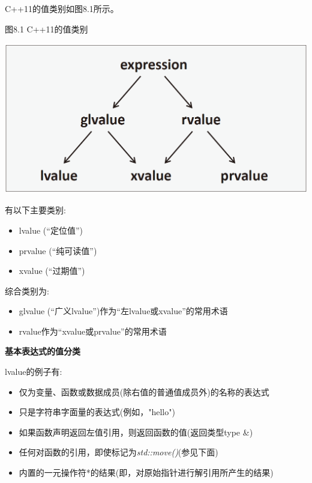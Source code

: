 C++11的值类别如图8.1所示。\par

\hspace*{\fill} \par %
图8.1 C++11的值类别\par

\begin{center}
	\includegraphics[width=1.0\textwidth]{content/1/chapter8/images/1}
\end{center}

有以下主要类别:\par

\begin{itemize}
	\item lvalue (“定位值”)
	\item prvalue (“纯可读值”)
	\item xvalue (“过期值”)
\end{itemize}

综合类别为:\par

\begin{itemize}
	\item glvalue (“广义lvalue”)作为“左lvalue或xvalue”的常用术语
	\item rvalue作为“xvalue或prvalue”的常用术语
\end{itemize}

\hspace*{\fill} \par %
\textbf{基本表达式的值分类}\par

lvalue的例子有:\par

\begin{itemize}
	\item 仅为变量、函数或数据成员(除右值的普通值成员外)的名称的表达式
	\item 只是字符串字面量的表达式(例如，"hello")
	\item 如果函数声明返回左值引用，则返回函数的值(返回类型type \&)
	\item 任何对函数的引用，即使标记为\textit{std::move()}(参见下面)
	\item 内置的一元操作符*的结果(即，对原始指针进行解引用所产生的结果)
\end{itemize}

